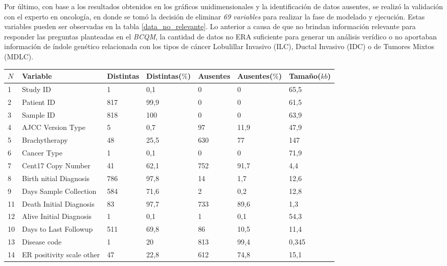 Por último, con base a los resultados obtenidos en los gráficos unidimensionales y la identificación de datos ausentes, se realizó la validación con el experto en oncología, en donde se tomó la decisión de eliminar \textit{69 variables} para realizar la fase de modelado y ejecución. Estas variables pueden ser observadas en la tabla \ref{data_no_relevante}. Lo anterior a causa de que no brindan información relevante para responder las preguntas planteadas en el \textit{BCQM}, la cantidad de datos no ERA suficiente para generar un análisis verídico o no aportaban información de índole genético relacionada con los tipos de cáncer Lobulillar Invasivo (ILC), Ductal Invasivo (IDC) o de Tumores Mixtos (MDLC).

\begin{table}[!htb]
	\footnotesize
	\centering
	\begin{threeparttable}
		\begin{tabular}{p{0.5cm} p{4cm} p{1.5cm} p{2cm} p{1.5cm} p{2cm} p{1.5cm}} \toprule
			$N$  &Variable &Distintas &Distintas($\%$) &Ausentes &Ausentes($\%$)  &Tamaño($kb$)
			\\ \hline	1	&	Study ID	&	1	&	0,1	&	0	&	0	&	65,5
			\\ \hline	2	&	Patient ID	&	817	&	99,9	&	0	&	0	&	61,5
			\\ \hline	3	&	Sample ID	&	818	&	100	&	0	&	0	&	63,9
			\\ \hline	4	&	AJCC Version Type	&	5	&	0,7	&	97	&	11,9	&	47,9
			\\ \hline	5	&	Brachytherapy 	&	48	&	25,5	&	630	&	77	&	147
			\\ \hline	6	&	Cancer Type	&	1	&	0,1	&	0	&	0	&	71,9
			\\ \hline	7	&	Cent17 Copy Number	&	41	&	62,1	&	752	&	91,7	&	4,4
			\\ \hline	8	&	Birth nitial Diagnosis 	&	786	&	97,8	&	14	&	1,7	&	12,6
			\\ \hline	9	&	Days Sample Collection	&	584	&	71,6	&	2	&	0,2	&	12,8
			\\ \hline	11	&	Death Initial Diagnosis 	&	83	&	97,7	&	733	&	89,6	&	1,3
			\\ \hline	12	&	Alive Initial Diagnosis	&	1	&	0,1	&	1	&	0,1	&	54,3
			\\ \hline	10	&	Days to Last Followup	&	511	&	69,8	&	86	&	10,5	&	11,4
			\\ \hline	13	&	Disease code	&	1	&	20	&	813	&	99,4	&	0,345
			\\ \hline	14	&	ER positivity scale other	&	47	&	22,8	&	612	&	74,8	&	15,1

\end{tabular}
\end{threeparttable}
\end{table}
